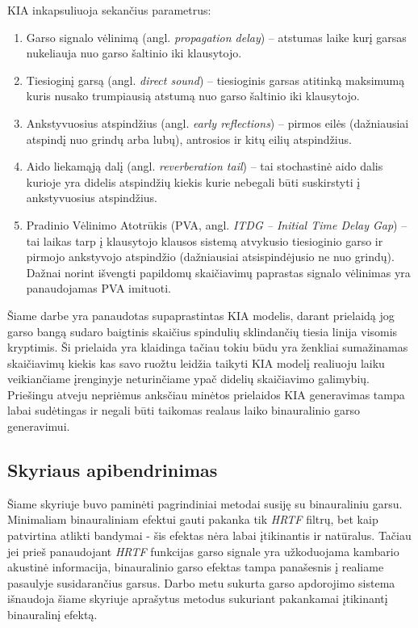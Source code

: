 \documentclass[]{vgtuef}
\begin{document}
KIA inkapsuliuoja sekančius parametrus:
\begin{enumerate}
  \item Garso signalo vėlinimą (angl. \textit{propagation delay}) – atstumas laike kurį garsas nukeliauja nuo garso šaltinio iki klausytojo.
  \item Tiesioginį garsą (angl. \textit{direct sound}) – tiesioginis garsas atitinką maksimumą kuris nusako trumpiausią atstumą nuo garso šaltinio iki klausytojo.
  \item Ankstyvuosius atspindžius (angl. \textit{early reflections}) – pirmos eilės (dažniausiai atspindį nuo grindų arba lubų), antrosios ir kitų eilių atspindžius.\item Aido liekamąją dalį (angl. \textit{reverberation tail}) – tai stochastinė aido dalis kurioje yra didelis atspindžių kiekis kurie nebegali būti suskirstyti į ankstyvuosius atspindžius.  
  \item Pradinio Vėlinimo Atotrūkis (PVA, angl. \textit{ITDG – Initial Time Delay Gap}) – tai laikas tarp į klausytojo klausos sistemą atvykusio tiesioginio garso ir pirmojo ankstyvojo atspindžio (dažniausiai atsispindėjusio ne nuo grindų). Dažnai norint išvengti papildomų skaičiavimų paprastas signalo vėlinimas yra panaudojamas PVA imituoti.
\end{enumerate}

Šiame darbe yra panaudotas supaprastintas KIA modelis, darant prielaidą jog garso bangą sudaro baigtinis skaičius spindulių sklindančių tiesia linija visomis kryptimis. Ši prielaida yra klaidinga tačiau tokiu būdu yra ženkliai sumažinamas skaičiavimų kiekis kas savo ruožtu leidžia taikyti KIA modelį realiuoju laiku veikiančiame įrenginyje neturinčiame ypač didelių skaičiavimo galimybių. Priešingu atveju nepriėmus anksčiau minėtos prielaidos KIA generavimas tampa labai sudėtingas ir negali būti taikomas realaus laiko binauralinio garso generavimui.


\subsection{Skyriaus apibendrinimas}

Šiame skyriuje buvo paminėti pagrindiniai metodai susiję su binauraliniu garsu. Minimaliam binauraliniam efektui gauti pakanka tik \textit{HRTF} filtrų, bet kaip patvirtina atlikti bandymai - šis efektas nėra labai įtikinantis ir natūralus. Tačiau jei prieš panaudojant \textit{HRTF} funkcijas garso signale yra užkoduojama kambario akustinė informacija, binauralinio garso efektas tampa panašesnis į realiame pasaulyje susidarančius garsus. 
Darbo metu sukurta garso apdorojimo sistema išnaudoja šiame skyriuje aprašytus metodus sukuriant pakankamai įtikinantį binauralinį efektą.
\end{document}
